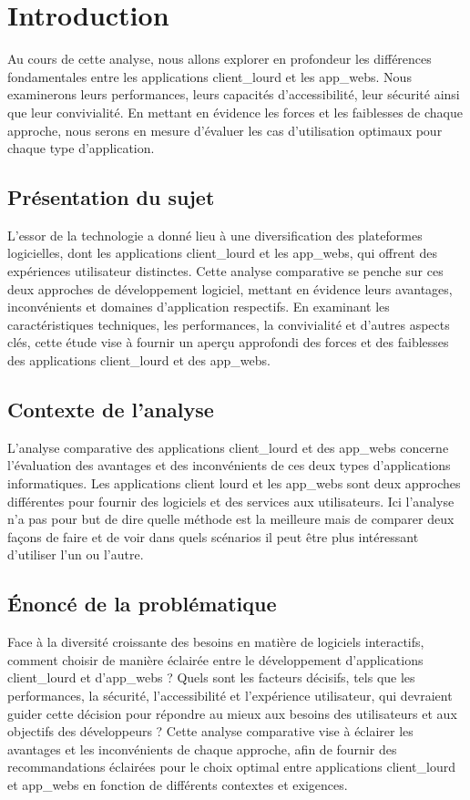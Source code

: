 \documentclass[a4paper, 12pt, french]{article}
\begin{document}
		\section{Introduction}
			Au cours de cette analyse, nous allons explorer en profondeur les différences fondamentales entre les applications \gls{client_lourd} et les \glspl{app_web}. Nous examinerons leurs performances, leurs capacités d'accessibilité, leur sécurité ainsi que leur convivialité. En mettant en évidence les forces et les faiblesses de chaque approche, nous serons en mesure d'évaluer les cas d'utilisation optimaux pour chaque type d'application.
			
			\subsection{Présentation du sujet}
				L'essor de la technologie a donné lieu à une diversification des plateformes logicielles, dont les applications \gls{client_lourd} et les \glspl{app_web}, qui offrent des expériences utilisateur distinctes. Cette analyse comparative se penche sur ces deux approches de développement logiciel, mettant en évidence leurs avantages, inconvénients et domaines d'application respectifs. En examinant les caractéristiques techniques, les performances, la convivialité et d'autres aspects clés, cette étude vise à fournir un aperçu approfondi des forces et des faiblesses des applications \gls{client_lourd} et des \glspl{app_web}.
			
			\subsection{Contexte de l'analyse}
				L'analyse comparative des applications \gls{client_lourd} et des \glspl{app_web} concerne l'évaluation des avantages et des inconvénients de ces deux types d'applications informatiques. Les applications client lourd et les \glspl{app_web} sont deux approches différentes pour fournir des logiciels et des services aux utilisateurs. Ici l'analyse n'a pas pour but de dire quelle méthode est la meilleure mais de comparer deux façons de faire et de voir dans quels scénarios il peut être plus intéressant d'utiliser l'un ou l'autre.
			
			\subsection{Énoncé de la problématique}		
				Face à la diversité croissante des besoins en matière de logiciels interactifs, comment choisir de manière éclairée entre le développement d'applications \gls{client_lourd} et d'\glspl{app_web} ? Quels sont les facteurs décisifs, tels que les performances, la sécurité, l'accessibilité et l'expérience utilisateur, qui devraient guider cette décision pour répondre au mieux aux besoins des utilisateurs et aux objectifs des développeurs ? Cette analyse comparative vise à éclairer les avantages et les inconvénients de chaque approche, afin de fournir des recommandations éclairées pour le choix optimal entre applications \gls{client_lourd} et \glspl{app_web} en fonction de différents contextes et exigences.
	
\end{document}
